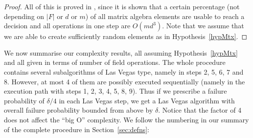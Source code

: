 \begin{proof}
All of this is proved in \cite{MeatAxeHoltRees, IL}, since it is shown that
a certain percentage (not depending on $|F|$ or $d$ or $m$) of all 
matrix algebra elements are usable to
reach a decision and all operations in one step are $O(md^3)$.
Note that we assume that we are able to create sufficiently random elements
as in Hypothesis~\ref{hypMtx}.
\end{proof}

We now summarise our complexity results, all assuming
Hypothesis~\ref{hypMtx} and all given in terms of number of field
operations. The whole procedure contains several subalgorithms of Las
Vegas type, namely in steps 2, 5, 6, 7 and 8. However, at most 4 of
them are possibly executed sequentially (namely in the execution path 
with steps 1, 2, 3, 4, 5, 8, 9). Thus if we prescribe a failure probability
of $\delta/4$ in each Las Vegas step, we get a Las Vegas algorithm with overall
failure probability bounded from above by $\delta$. Notice that the factor of 4 does not affect the ``big O'' complexity. 
We follow the numbering in our summary of the 
complete procedure in Section~\ref{sec:defns}:

